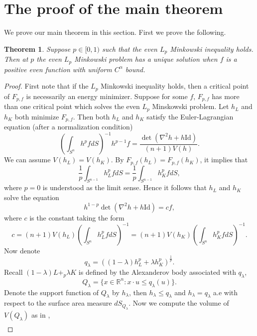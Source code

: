 \documentclass[reqno]{amsart}
\theoremstyle{remark}
\def\R{\mathbb{R}}
\def\l{\lambda}
\theoremstyle{plain}
\newtheorem{thm}{Theorem}
\begin{document}
\section{The proof of the main theorem}
We prove our main theorem in this section. 
First we prove the following.

\begin{thm}\label{uniqueness-01}
    Suppose $p\in [0, 1)$ such that the even $L_p$ Minkowski inequality holds. Then at $p$ the even $L_p$ Minkowski problem has a unique solution when $f$ is a positive even function with uniform $C^\alpha$ bound. 
\end{thm}

\begin{proof}First note that if the $L_p$ Minkowski inequality holds, then a critical point of $F_{p, f}$ is necessarily an energy minimizer. 
Suppose for some $f$, $F_{p, f}$ has more than one critical point which solves the even $L_p$ Minskowski problem. 
Let $h_L$ and $h_K$ both minimize $F_{p, f}$. Then both $h_L$ and $h_K$ satisfy the Euler-Lagrangian equation (after a normalization condition)
\begin{equation}\label{normal-001}
\left({\displaystyle\int_{S^{n}}h^{p} fdS}\right)^{-1}h^{p-1} f=\frac{\det(\nabla^2 h+h \text{Id})}{(n+1)V(h)}.    
\end{equation}
We can assume $V(h_L)=V(h_K)$. 
By
$F_{p, f}(h_L)=F_{p, f}(h_K)$, it
 implies that 
 \begin{equation}
     \frac{1}{p}\int_{S^{n-1}} h_L^{p} fdS=\frac{1}{p}\int_{S^{n-1}} h_K^{p} fdS,
 \end{equation} 
 where $p=0$ is understood as the limit sense. Hence it follows that $h_L$ and $h_K$ solve the equation
 \begin{equation}
     h^{1-p}\det(\nabla^2 h+h\text{Id})=cf,
 \end{equation}
 where $c$ is the constant taking the form
 \[
 c=(n+1)V(h_L) \left(\int_{S^n} h_L^p fdS\right)^{-1}=(n+1)V(h_K) \left(\int_{S^n} h_K^p fdS\right)^{-1}. 
 \]
 Now denote
\[
q_\l=\left((1-\l) h_L^{p}+\l h_K^{p}\right)^{\frac{1}{p}}.
\]
Recall  $(1-\l)L+_{p}\l K$ is defined by the Alexanderov body associated with $q_\l$,
\[
Q_\l=\{x\in \R^n: x\cdot u\leq q_\l(u)\}. 
\]
Denote the support function of $Q_\l$ by $h_\l$, then $h_\l\leq q_\l$ and $h_\l=q_\l$ a.e with respect to the surface area measure $dS_{Q_\l}$.
Now we compute the volume of $V(Q_\l)$ as in \cite[Lemma 3.1]{BLYZ01},
\begin{equation}
\begin{split}

\end{split}
\end{equation}
\end{proof}
\end{document}
